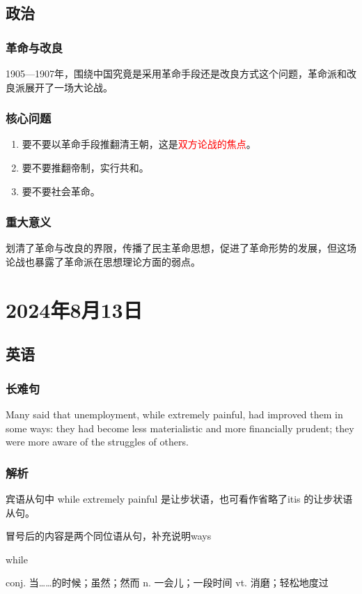 \documentclass[UTF8]{ctexart}
\begin{document}
\subsection{政治}
\subsubsection{革命与改良}
1905---1907年，围绕中国究竟是采用革命手段还是改良方式这个问题，革命派和改良派展开了一场大论战。
\subsubsection{核心问题}
\begin{enumerate}
      \item 要不要以革命手段推翻清王朝，这是\textcolor{red}{双方论战的焦点}。
      \item 要不要推翻帝制，实行共和。
      \item 要不要社会革命。
\end{enumerate}
\subsubsection{重大意义}
划清了革命与改良的界限，传播了民主革命思想，促进了革命形势的发展，但这场论战也暴露了革命派在思想理论方面的弱点。
\section{2024年8月13日}
\subsection{英语}
\subsubsection{长难句}
Many said that unemployment, while extremely painful, had improved them in some ways: they had become less materialistic and more financially prudent; they were more aware of the struggles of others.
\subsubsection{解析}
宾语从句中 while extremely painful 是让步状语，也可看作省略了itis 的让步状语从句。

冒号后的内容是两个同位语从句，补充说明ways

while

conj. 当……的时候；虽然；然而
n. 一会儿；一段时间
vt. 消磨；轻松地度过
\end{document}
